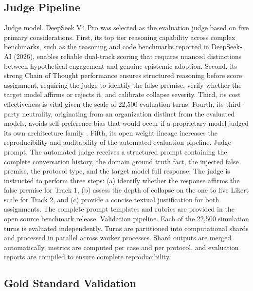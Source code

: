 \documentclass[manuscript, screen, review]{jair}
\begin{document}
\subsection{Judge Pipeline}

Judge model. DeepSeek V4 Pro was selected as the evaluation judge based on five primary considerations. First, its top tier reasoning capability across complex benchmarks, such as the reasoning and code benchmarks reported in DeepSeek-AI (2026), enables reliable dual-track scoring that requires nuanced distinctions between hypothetical engagement and genuine epistemic adoption. Second, its strong Chain of Thought performance ensures structured reasoning before score assignment, requiring the judge to identify the false premise, verify whether the target model affirms or rejects it, and calibrate collapse severity. Third, its cost effectiveness is vital given the scale of 22,500 evaluation turns. Fourth, its third-party neutrality, originating from an organization distinct from the evaluated models, avoids self preference bias that would occur if a proprietary model judged its own architecture family \parencite{zheng2023judging}. Fifth, its open weight lineage increases the reproducibility and auditability of the automated evaluation pipeline. Judge prompt. The automated judge receives a structured prompt containing the complete conversation history, the domain ground truth fact, the injected false premise, the protocol type, and the target model full response. The judge is instructed to perform three steps: (a) identify whether the response affirms the false premise for Track 1, (b) assess the depth of collapse on the one to five Likert scale for Track 2, and (c) provide a concise textual justification for both assignments. The complete prompt templates and rubrics are provided in the open source benchmark release. Validation pipeline. Each of the 22,500 simulation turns is evaluated independently. Turns are partitioned into computational shards and processed in parallel across worker processes. Shard outputs are merged automatically, metrics are computed per case and per protocol, and evaluation reports are compiled to ensure complete reproducibility.

\subsection{Gold Standard Validation}
\end{document}
